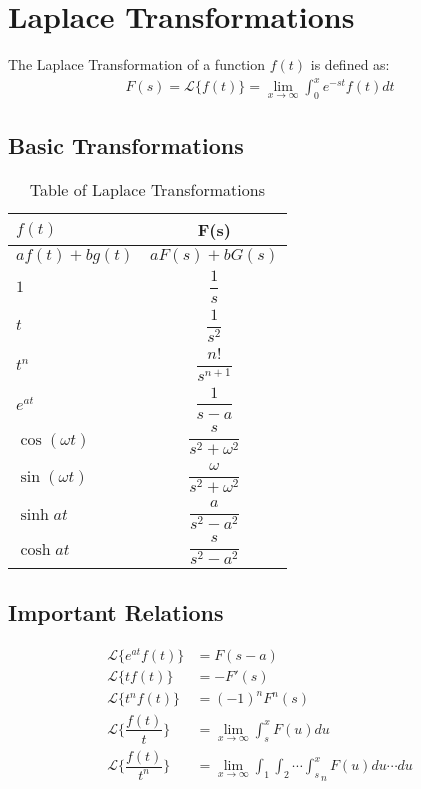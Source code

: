 \documentclass[../main.tex]{subfile}
\begin{document}
    \chapter{Laplace Transformations}
     The Laplace Transformation of a function $f(t)$ is defined as:
    \begin{align}
        F(s)=\mathcal{L} \lbrace f(t)\rbrace=\lim_{x\to\infty}\int_0^x e^{-st}f(t) dt
    \end{align}
    
    \section{Basic Transformations}
    
    \begin{table}[!h]
    \begin{center}
    \caption{Table of Laplace Transformations}
    \label{laplace}
    \begin{tabular}{l|c}
    $f(t)$ & F(s)\\
    \hline
    $af(t) + bg(t)$ & $a F(s) + b G(s)$\\
    $ 1 $ & $ \dfrac{1}{s} $ \\
    $ t $ & $ \dfrac{1}{s^2} $\\
    $ t^n $ & $ \dfrac{n!}{s^{n + 1}} $\\
    $ e^{at} $ & $ \dfrac{1}{s-a} $\\
    $ \cos (\omega t) $ & $ \dfrac{s}{s^2 + \omega^2} $\\
    $ \sin (\omega t) $ & $\dfrac{\omega}{s^2 + \omega^2} $\\
    $ \sinh at $ & $ \dfrac{a}{s^2 - a^2} $\\
    $ \cosh at $ & $ \dfrac{s}{s^2 - a^2} $\\
    \end{tabular}
    \end{center}
    \end{table}

    \section{Important Relations}
    \begin{align}
        \mathcal{L} \lbrace e^{at} f(t) \rbrace & = F(s - a)\\
        \mathcal{L} \lbrace t f(t) \rbrace & = - F'(s)\\
        \mathcal{L} \lbrace t^n f(t) \rbrace & = (-1)^n F^n(s)\\
        \mathcal{L} \lbrace \dfrac{f(t)}{t} \rbrace & = \lim_{x\to\infty} \int_s^x F(u) du\\
        \mathcal{L} \lbrace \dfrac{f(t)}{t^n} \rbrace & = \lim_{x\to\infty} \int_1\int_2\cdots{\int_s^x}_n F(u) du\cdots du
    \end{align}
\end{document}
